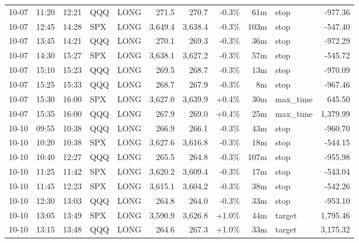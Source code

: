 \documentclass[11pt,a4paper,twoside]{article}
\begin{document}
\begin{center}
\begin{longtable}{>{\color{txtmain}}l l l l l r r r r >{\color{txtmain}}l r}
10-07 & 11:20 & 12:21 & QQQ & LONG & 271.5 & 270.7 & \textcolor{lossred}{-0.3\%} & 61m & stop & \textcolor{lossred}{-977.36} \\
10-07 & 12:45 & 14:28 & SPX & LONG & 3,649.4 & 3,638.4 & \textcolor{lossred}{-0.3\%} & 103m & stop & \textcolor{lossred}{-547.40} \\
10-07 & 13:45 & 14:21 & QQQ & LONG & 270.1 & 269.3 & \textcolor{lossred}{-0.3\%} & 36m & stop & \textcolor{lossred}{-972.29} \\
10-07 & 14:30 & 15:27 & SPX & LONG & 3,638.1 & 3,627.2 & \textcolor{lossred}{-0.3\%} & 57m & stop & \textcolor{lossred}{-545.72} \\
10-07 & 15:10 & 15:23 & QQQ & LONG & 269.5 & 268.7 & \textcolor{lossred}{-0.3\%} & 13m & stop & \textcolor{lossred}{-970.09} \\
10-07 & 15:25 & 15:33 & QQQ & LONG & 268.7 & 267.9 & \textcolor{lossred}{-0.3\%} & 8m & stop & \textcolor{lossred}{-967.46} \\
10-07 & 15:30 & 16:00 & SPX & LONG & 3,627.0 & 3,639.9 & \textcolor{wingreen}{+0.4\%} & 30m & max\_time & \textcolor{wingreen}{645.50} \\
10-07 & 15:35 & 16:00 & QQQ & LONG & 267.9 & 269.0 & \textcolor{wingreen}{+0.4\%} & 25m & max\_time & \textcolor{wingreen}{1,379.99} \\
10-10 & 09:55 & 10:38 & QQQ & LONG & 266.9 & 266.1 & \textcolor{lossred}{-0.3\%} & 43m & stop & \textcolor{lossred}{-960.70} \\
10-10 & 10:20 & 10:38 & SPX & LONG & 3,627.6 & 3,616.8 & \textcolor{lossred}{-0.3\%} & 18m & stop & \textcolor{lossred}{-544.15} \\
10-10 & 10:40 & 12:27 & QQQ & LONG & 265.5 & 264.8 & \textcolor{lossred}{-0.3\%} & 107m & stop & \textcolor{lossred}{-955.98} \\
10-10 & 11:25 & 11:42 & SPX & LONG & 3,620.2 & 3,609.4 & \textcolor{lossred}{-0.3\%} & 17m & stop & \textcolor{lossred}{-543.04} \\
10-10 & 11:45 & 12:23 & SPX & LONG & 3,615.1 & 3,604.2 & \textcolor{lossred}{-0.3\%} & 38m & stop & \textcolor{lossred}{-542.26} \\
10-10 & 12:30 & 13:03 & QQQ & LONG & 264.8 & 264.0 & \textcolor{lossred}{-0.3\%} & 33m & stop & \textcolor{lossred}{-953.10} \\
10-10 & 13:05 & 13:49 & SPX & LONG & 3,590.9 & 3,626.8 & \textcolor{wingreen}{+1.0\%} & 44m & target & \textcolor{wingreen}{1,795.46} \\
10-10 & 13:15 & 13:48 & QQQ & LONG & 264.6 & 267.3 & \textcolor{wingreen}{+1.0\%} & 33m & target & \textcolor{wingreen}{3,175.32} \\

\end{longtable}
\end{center}
\end{document}
